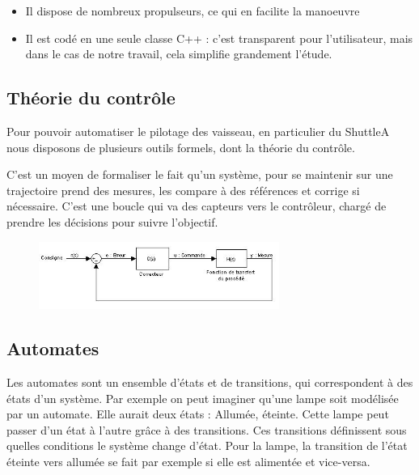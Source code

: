 \documentclass[a4paper,11pt]{article}
\begin{document}
\begin{itemize}
	\item Il dispose de nombreux propulseurs, ce qui en facilite la manoeuvre
	\item Il est codé en une seule classe C++ : c'est transparent pour l'utilisateur, mais dans le cas de notre travail, cela simplifie grandement l'étude.
\end{itemize}


\subsection{Théorie du contrôle}
Pour pouvoir automatiser le pilotage des vaisseau, en particulier du ShuttleA nous disposons de plusieurs outils formels, dont la théorie du contrôle.

C'est un moyen de formaliser le fait qu'un système, pour se maintenir sur une trajectoire prend des mesures, les compare à des références et corrige si nécessaire. C'est une boucle qui va des capteurs vers le contrôleur, chargé de prendre les décisions pour suivre l'objectif.

\begin{figure}[!h]
            \begin{center}
                \includegraphics[width=0.7\textwidth]{img/boucle_controle.jpg}
            \end{center}
\end{figure}

\subsection{Automates}
Les automates sont un ensemble d'états et de transitions, qui correspondent à des états d'un système. Par exemple on peut imaginer qu'une lampe soit modélisée par un automate. Elle aurait deux états : Allumée, éteinte. Cette lampe peut passer d'un état à l'autre grâce à des transitions.
Ces transitions définissent sous quelles conditions le système change d'état.
Pour la lampe, la transition de l'état éteinte vers allumée se fait par exemple si elle est alimentée et vice-versa.
\end{document}
